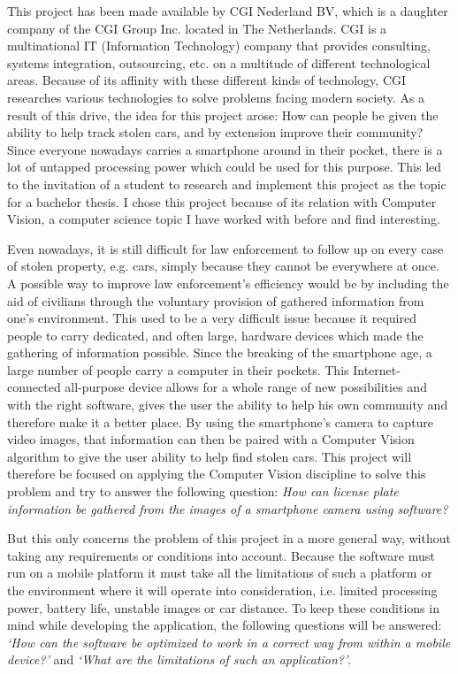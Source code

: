 
This project has been made available by CGI Nederland BV, which is a daughter company of the CGI Group Inc. located in The Netherlands. CGI is a multinational IT (Information Technology) company that provides consulting, systems integration, outsourcing, etc. on a multitude of different technological areas. Because of its affinity with these different kinds of technology, CGI researches various technologies to solve problems facing modern society. As a result of this drive, the idea for this project arose: How can people be given the ability to help track stolen cars, and by extension improve their community? Since everyone nowadays carries a smartphone around in their pocket, there is a lot of untapped processing power which could be used for this purpose. This led to the invitation of a student to research and implement this project as the topic for a bachelor thesis. I chose this project because of its relation with Computer Vision, a computer science topic I have worked with before and find interesting.


Even nowadays, it is still difficult for law enforcement to follow up on every case of stolen property, e.g. cars, simply because they cannot be everywhere at once. A possible way to improve law enforcement's efficiency would be by including the aid of civilians through the voluntary provision of gathered information from one's environment. This used to be a very difficult issue because it required people to carry dedicated, and often large, hardware devices which made the gathering of information possible. Since the breaking of the smartphone age, a large number of people carry a computer in their pockets. This Internet-connected all-purpose device allows for a whole range of new possibilities and with the right software, gives the user the ability to help his own community and therefore make it a better place. By using the smartphone's camera to capture video images, that information can then be paired with a Computer Vision algorithm to give the user ability to help find stolen cars. This project will therefore be focused on applying the Computer Vision discipline to solve this problem and try to answer the following question: \textit{How can license plate information be gathered from the images of a smartphone camera using software?}

But this only concerns the problem of this project in a more general way, without taking any requirements or conditions into account. Because the software must run on a mobile platform it must take all the limitations of such a platform or the environment where it will operate into consideration, i.e. limited processing power, battery life, unstable images or car distance. To keep these conditions in mind while developing the application, the following questions will be answered: \textit{`How can the software be optimized to work in a correct way from within a mobile device?'} and \textit{`What are the limitations of such an application?'}.

